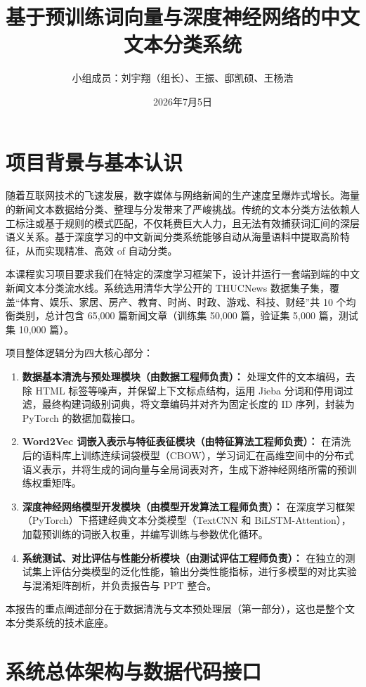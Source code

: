 \documentclass[UTF8,a4paper,11pt]{ctexart}
\title{\heiti 基于预训练词向量与深度神经网络的中文文本分类系统}
\author{小组成员：刘宇翔（组长）、王振、邸凯硕、王杨浩}
\date{2026年7月5日}
\begin{document}
\maketitle
\newpage
\tableofcontents
\newpage

\section{项目背景与基本认识}
随着互联网技术的飞速发展，数字媒体与网络新闻的生产速度呈爆炸式增长。海量的新闻文本数据给分类、整理与分发带来了严峻挑战。传统的文本分类方法依赖人工标注或基于规则的模式匹配，不仅耗费巨大人力，且无法有效捕获词汇间的深层语义关系。基于深度学习的中文新闻分类系统能够自动从海量语料中提取高阶特征，从而实现精准、高效 of 自动分类。

本课程实习项目要求我们在特定的深度学习框架下，设计并运行一套端到端的中文新闻文本分类流水线。系统选用清华大学公开的 THUCNews 数据集子集，覆盖“体育、娱乐、家居、房产、教育、时尚、时政、游戏、科技、财经”共 10 个均衡类别，总计包含 65,000 篇新闻文章（训练集 50,000 篇，验证集 5,000 篇，测试集 10,000 篇）。

项目整体逻辑分为四大核心部分：
\begin{enumerate}
    \item \textbf{数据基本清洗与预处理模块（由数据工程师负责）：} 处理文件的文本编码，去除 HTML 标签等噪声，并保留上下文标点结构，运用 Jieba 分词和停用词过滤，最终构建词级别词典，将文章编码并对齐为固定长度的 ID 序列，封装为 PyTorch 的数据加载接口。
    \item \textbf{Word2Vec 词嵌入表示与特征表征模块（由特征算法工程师负责）：} 在清洗后的语料库上训练连续词袋模型（CBOW），学习词汇在高维空间中的分布式语义表示，并将生成的词向量与全局词表对齐，生成下游神经网络所需的预训练权重矩阵。
    \item \textbf{深度神经网络模型开发模块（由模型开发算法工程师负责）：} 在深度学习框架（PyTorch）下搭建经典文本分类模型（TextCNN 和 BiLSTM-Attention），加载预训练的词嵌入权重，并编写训练与参数优化循环。
    \item \textbf{系统测试、对比评估与性能分析模块（由测试评估工程师负责）：} 在独立的测试集上评估分类模型的泛化性能，输出分类性能指标，进行多模型的对比实验与混淆矩阵剖析，并负责报告与 PPT 整合。
\end{enumerate}

本报告的重点阐述部分在于数据清洗与文本预处理层（第一部分），这也是整个文本分类系统的技术底座。

\section{系统总体架构与数据代码接口}
\end{document}
